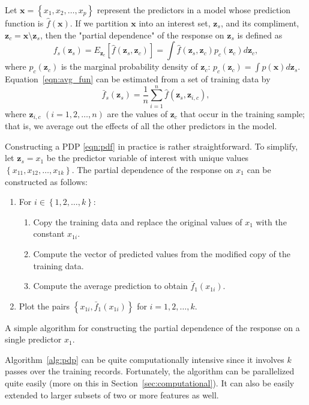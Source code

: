 Let $\boldsymbol{x} = \left\{x_1, x_2, \dots, x_p\right\}$ represent the predictors in a model whose prediction function is $\widehat{f}\left(\boldsymbol{x}\right)$. If we partition $\boldsymbol{x}$ into an interest set, $\boldsymbol{z}_s$, and its compliment, $\boldsymbol{z}_c = \boldsymbol{x} \setminus \boldsymbol{z}_s$, then the "partial dependence" of the response on $\boldsymbol{z}_s$ is defined as
\begin{equation}
\label{eqn:avg_fun}
  f_s\left(\boldsymbol{z}_s\right) = E_{\boldsymbol{z}_c}\left[\widehat{f}\left(\boldsymbol{z}_s, \boldsymbol{z}_c\right)\right] = \int \widehat{f}\left(\boldsymbol{z}_s, \boldsymbol{z}_c\right)p_{c}\left(\boldsymbol{z}_c\right)d\boldsymbol{z}_c,
\end{equation}
where $p_{c}\left(\boldsymbol{z}_c\right)$ is the marginal probability density of $\boldsymbol{z}_c$: $p_{c}\left(\boldsymbol{z}_c\right) = \int p\left(\boldsymbol{x}\right)d\boldsymbol{z}_s$.
Equation~\eqref{eqn:avg_fun} can be estimated from a set of training data by
\begin{equation}
\label{eqn:pdf}
\bar{f}_s\left(\boldsymbol{z}_s\right) = \frac{1}{n}\sum_{i = 1}^n\widehat{f}\left(\boldsymbol{z}_s,\boldsymbol{z}_{i, c}\right),
\end{equation}
where $\boldsymbol{z}_{i, c}$ $\left(i = 1, 2, \dots, n\right)$ are the values of $\boldsymbol{z}_c$ that occur in the training sample; that is, we average out the effects of all the other predictors in the model.

Constructing a PDP \eqref{eqn:pdf} in practice is rather straightforward. To simplify, let $\boldsymbol{z}_s = x_1$ be the predictor variable of interest with unique values $\left\{x_{11}, x_{12}, \dots, x_{1k}\right\}$. The partial dependence of the response on $x_1$ can be constructed as follows:

\begin{algorithm}
\begin{enumerate}
  \item For $i \in \left\{1, 2, \dots, k\right\}$:
  \begin{enumerate}
    \item Copy the training data and replace the original values of $x_1$ with the constant $x_{1i}$.
    \item Compute the vector of predicted values from the modified copy of the training data.
    \item Compute the average prediction to obtain $\bar{f}_1\left(x_{1i}\right)$.
  \end{enumerate}
  \item Plot the pairs $\left\{x_{1i}, \bar{f}_1\left(x_{1i}\right)\right\}$ for $i = 1, 2, \dotsc, k$.
\end{enumerate}
\caption{A simple algorithm for constructing the partial dependence of the response on a single predictor $x_1$. \label{alg:pdp}}
\end{algorithm}
Algorithm~\ref{alg:pdp} can be quite computationally intensive since it involves $k$ passes over the training records. Fortunately, the algorithm can be parallelized quite easily (more on this in Section~\ref{sec:computational}). It can also be easily extended to larger subsets of two or more features as well.

